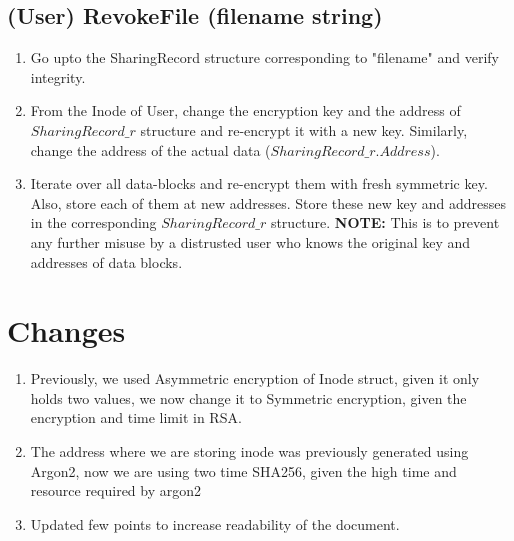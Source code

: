 \documentclass[a4paper, 12pt]{scrartcl}
\begin{document}
\subsection{(User) RevokeFile (filename string)}
\begin{enumerate}
	\itemsep0em
	\item Go upto the SharingRecord structure corresponding to "filename" and verify integrity.
	\item From the Inode of User, change the encryption key and the address of $SharingRecord\_r$ structure and re-encrypt it with a new key. Similarly, change the address of the actual data ($SharingRecord\_r.Address$).
	\item Iterate over all data-blocks and re-encrypt them with fresh symmetric key. Also, store each of them at new addresses. Store these new key and addresses in the corresponding $SharingRecord\_r$ structure. \textbf{NOTE:} This is to prevent any further misuse by a distrusted user who knows the original key and addresses of data blocks.
\end{enumerate}

\section{Changes}

\begin{enumerate}
	\itemsep0em
	\item Previously, we used Asymmetric encryption of Inode struct, given it only holds two values, we now change it to Symmetric encryption, given the encryption and time limit in RSA.  
	\item The address where we are storing inode was previously generated using Argon2, now we are using two time SHA256, given the high time and resource required by argon2
	\item Updated few points to increase readability of the document.
\end{enumerate}
\end{document}

